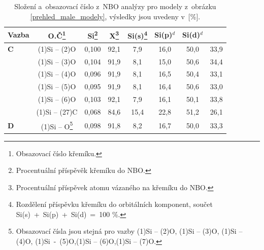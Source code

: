 \documentclass[
digital, %
table,   %
nolof,     %
nolot,     %
oneside,
]{fithesis3}
\begin{document}
\begin{table}[H]
\begin{minipage}{\textwidth}
\caption{Složení a~obsazovací číslo z~NBO analýzy pro modely z~obrázku \ref{prehled_male_modely}, výsledky jsou uvedeny v~[\%].}
\begin{center}
\begin{tabular}{|l|c|c|c|c|c|c|c|}
\hline
\label{nbo_smallII} Vazba & O.Č\footnote{Obsazovací číslo křemíku.} & Si\footnote{Procentuální příspěvěk křemíku do NBO.} & X\footnote{Procentuální příspěvek atomu vázaného na křemíku do NBO.} & Si(s)\footnote{Rozdělení příspěvku křemíku do orbitálních komponent, součet Si(s)~+~Si(p)~+~Si(d)~=~100 \%.} & Si(p)$^d$ &Si(d)$^d$ \\ \hline
\textbf{C} & (1)Si -- (2)O  & 0,100 & 92,1  & 7,9  & 16,0  & 50,0  & 33,9  \\ \hline
& (1)Si -- (3)O & 0,104 & 91,9  & 8,1  & 15,0  & 50,6  & 34,4  \\ \hline
&  (1)Si -- (4)O& 0,096 & 91,9  & 8,1  & 16,5  & 50,4  & 33,1  \\ \hline
&  (1)Si -- (5)O &0,095 & 91,9  & 8,1  & 16,4  & 50,6  & 33,0  \\ \hline
&  (1)Si -- (6)O & 0,103 & 92,1  & 7,9  & 16,1  & 50,1  & 33,8  \\ \hline
& (1)Si -- (27)C & 0,068 & 84,6  & 15,4  & 22,8  & 51,2  & 26,1  \\ \hline
\textbf{D} & (1)Si -- O\footnote{Obsazovací čísla jsou stejná pro vazby (1)Si -- (2)O, (1)Si -- (3)O, (1)Si -- (4)O, (1)Si~-~(5)O,(1)Si -- (6)O,(1)Si -- (7)O.}  & 0,098 & 91,8  & 8,2  & 16,7  & 50,0  & 33,3  \\ \hline
\end{tabular}
\end{center}
\end{minipage}
\end{table}

\newpage
\end{document}
